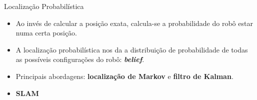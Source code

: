 \documentclass{beamer}
\newlength{\wideitemsep}
\let\olditem\item
\renewcommand{\item}{\setlength{\itemsep}{\wideitemsep}\olditem}
\begin{document}
\begin{frame}{Localização Probabilística}
\begin{itemize}
  \item Ao invés de calcular a posição exata, calcula-se a 
  probabilidade do robô estar numa certa posição.
  \item A localização probabilística nos da a distribuição de probabilidade de todas as possíveis 
 configurações do robô: \textit{\textbf{belief}}.
  \item Principais abordagens: \textbf{localização de Markov} e \textbf{filtro de Kalman}.
  \item \textbf{SLAM}
\end{itemize}
\end{frame}

\end{document}
